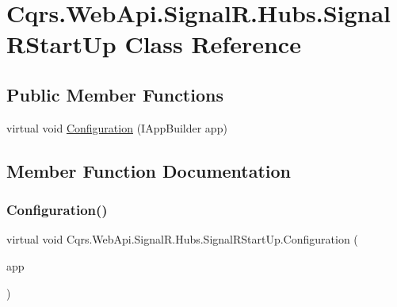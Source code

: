 \hypertarget{classCqrs_1_1WebApi_1_1SignalR_1_1Hubs_1_1SignalRStartUp}{}\section{Cqrs.\+Web\+Api.\+Signal\+R.\+Hubs.\+Signal\+R\+Start\+Up Class Reference}
\label{classCqrs_1_1WebApi_1_1SignalR_1_1Hubs_1_1SignalRStartUp}
\subsection*{Public Member Functions}
\begin{DoxyCompactItemize}
\item 
virtual void \hyperlink{classCqrs_1_1WebApi_1_1SignalR_1_1Hubs_1_1SignalRStartUp_a0d670a1f640c6fd19edda463fe708879}{Configuration} (I\+App\+Builder app)
\end{DoxyCompactItemize}


\subsection{Member Function Documentation}
\mbox{\label{classCqrs_1_1WebApi_1_1SignalR_1_1Hubs_1_1SignalRStartUp_a0d670a1f640c6fd19edda463fe708879}} 
\subsubsection{\texorpdfstring{Configuration()}{Configuration()}}
{\footnotesize\ttfamily virtual void Cqrs.\+Web\+Api.\+Signal\+R.\+Hubs.\+Signal\+R\+Start\+Up.\+Configuration (\begin{DoxyParamCaption}\item[{I\+App\+Builder}]{app }\end{DoxyParamCaption})\hspace{0.3cm}{\ttfamily [virtual]}}

